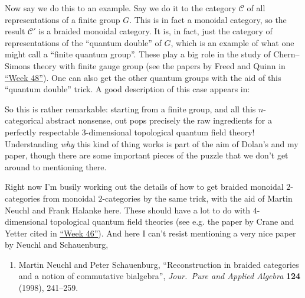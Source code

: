 \documentclass[12pt]{article}
\def\tightlist{}
\renewcommand{\texttt}[1]{%
  \begingroup
  \ttfamily
  \begingroup\lccode`~=`/\lowercase{\endgroup\def~}{/\discretionary{}{}{}}%
  \begingroup\lccode`~=`[\lowercase{\endgroup\def~}{[\discretionary{}{}{}}%
  \begingroup\lccode`~=`.\lowercase{\endgroup\def~}{.\discretionary{}{}{}}%
  \catcode`/=\active\catcode`[=\active\catcode`.=\active
  \scantokens{#1\noexpand}%
  \endgroup
}
\begin{document}
Now say we do this to an example. Say we do it to the category
\(\mathcal{C}\) of all representations of a finite group \(G\). This is
in fact a monoidal category, so the result \(\mathcal{C}'\) is a braided
monoidal category. It is, in fact, just the category of representations
of the ``quantum double'' of \(G\), which is an example of what one
might call a ``finite quantum group''. These play a big role in the
study of Chern--Simons theory with finite gauge group (see the papers by
Freed and Quinn in \protect\hyperlink{week48}{``Week 48''}). One can
also get the other quantum groups with the aid of this ``quantum
double'' trick. A good description of this case appears in:


So this is rather remarkable: starting from a finite group, and all this
\(n\)-categorical abstract nonsense, out pops precisely the raw
ingredients for a perfectly respectable \(3\)-dimensional topological
quantum field theory! Understanding \emph{why} this kind of thing works
is part of the aim of Dolan's and my paper, though there are some
important pieces of the puzzle that we don't get around to mentioning
there.

Right now I'm busily working out the details of how to get braided
monoidal \(2\)-categories from monoidal \(2\)-categories by the same
trick, with the aid of Martin Neuchl and Frank Halanke here. These
should have a lot to do with \(4\)-dimensional topological quantum field
theories (see e.g. the paper by Crane and Yetter cited in
\protect\hyperlink{week46}{``Week 46''}). And here I can't resist
mentioning a very nice paper by Neuchl and Schauenburg,

\begin{enumerate}
\def\labelenumi{\arabic{enumi})}
\setcounter{enumi}{3}
\tightlist
\item
  Martin Neuchl and Peter Schauenburg, ``Reconstruction in braided categories 
  and a notion of commutative bialgebra'',  \emph{Jour.\ Pure and Applied 
  Algebra} \textbf{124} (1998), 241--259.
\end{enumerate}
\end{document}
